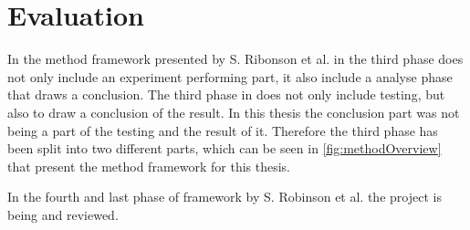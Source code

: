 \section{Evaluation}\label{sec:methodEvaluation}
In the method framework presented by S. Ribonson et al. in \cite{SecretsSuccessfulSimulation1995} the third phase does not only include an experiment performing part, it also include a analyse phase that draws a conclusion.
The third phase in \cite{SecretsSuccessfulSimulation1995} does not only include testing, but also to draw a conclusion of the result.
In this thesis the conclusion part was not being a part of the testing and the result of it. 
Therefore the third phase has been split into two different parts, which can be seen in \cref{fig:methodOverview} that present the method framework for this thesis.

\bigskip

In the fourth and last phase of framework by S. Robinson et al. \cite{SecretsSuccessfulSimulation1995} the project is being and reviewed.
